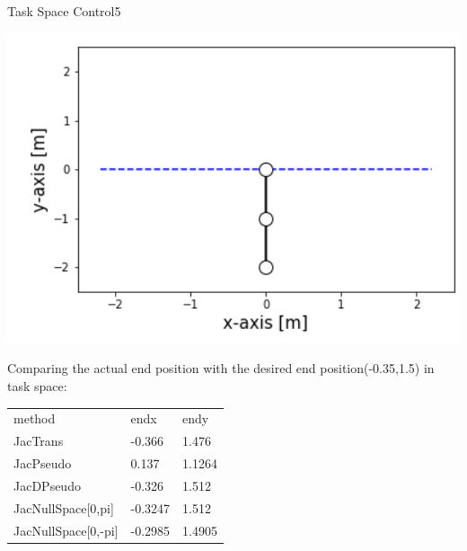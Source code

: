 \begin{questions}
\begin{question}[bonus]{Task Space Control}{5}
\begin{answer}
		
			\noindent\begin{minipage}{.5\textwidth}
				\centering
				\includegraphics[width=1\textwidth]{img/2finitialpos.png} 
				\label{fig:2f3}            
			\end{minipage}%
			\begin{minipage}{.5\textwidth}
             Comparing the actual end position with the desired end position(-0.35,1.5) in task space:\\
             \begin{tabular}{ l l l }
             	method & endx & endy \\
             	JacTrans & -0.366 & 1.476 \\
             	JacPseudo &  0.137 & 1.1264 \\
             	JacDPseudo & -0.326 & 1.512 \\
             	JacNullSpace[0,pi] & -0.3247 & 1.512 \\
             	JacNullSpace[0,-pi] & -0.2985 & 1.4905 \\
             \end{tabular}
			\end{minipage}



\end{answer}
\end{question}
\end{questions}
